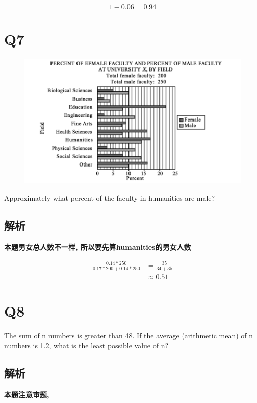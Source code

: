     \begin{equation*}
      1 - 0.06 = 0.94
    \end{equation*}

\section{Q7}

  \begin{figure}[H]
    \centering
    \includegraphics[width=0.7\columnwidth]{images/areas/stats/q7.png}
  \end{figure}

  Approximately what percent of the faculty in humanities are male?

  \subsection{解析}

    \textbf{本题男女总人数不一样, 所以要先算humanities的男女人数}

    \begin{align*}
      \frac{0.14 * 250}{0.17 * 200 + 0.14 * 250}
      &= \frac{35}{34 + 35} \\
      &\approx 0.51
    \end{align*}

\section{Q8}

  The sum of n numbers is greater than 48. If the average (arithmetic mean)
  of n numbers is 1.2, what is the least possible value of n?

  \subsection{解析}

    \textbf{本题注意审题, }

